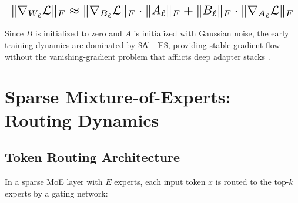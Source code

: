 \documentclass[11pt,a4paper]{article}
\begin{document}
\begin{equation}
\resizebox{\columnwidth}{!}{$\displaystyle
\begin{aligned}
\|\nabla_{W_\ell}\mathcal{L}\|_F \approx \|\nabla_{B_\ell}\mathcal{L}\|_F \cdot \|A_\ell\|_F + \|B_\ell\|_F \cdot \|\nabla_{A_\ell}\mathcal{L}\|_F
\end{aligned}
$}
\end{equation}



























Since $B$ is initialized to zero and $A$ is initialized with Gaussian noise, the early training dynamics are dominated by \$\|A\_\ell\|\_F\$, providing stable gradient flow without the vanishing-gradient problem that afflicts deep adapter stacks \cite{arxiv_2305_18290}.




\section{Sparse Mixture-of-Experts: Routing Dynamics}



\subsection{Token Routing Architecture}


In a sparse MoE layer with $E$ experts, each input token $x$ is routed to the top-$k$ experts by a gating network:
\end{document}
